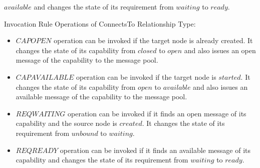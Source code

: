 \documentclass[12pt]{report}
\begin{document}
\begin{description}
\begin{itemize}
    $available$ and changes the state of its requirement from
    $waiting$ to $ready$.
  \end{itemize}
\item[] Invocation Rule Operations of ConnectsTo Relationship Type:
  \begin{itemize}
  \item $CAPOPEN$ operation can be invoked if the target node is
    already created. It changes the state of its capability from
    $closed$ to $open$ and also issues an open message of the
    capability to the message pool.
  \item $CAPAVAILABLE$ operation can be invoked if the target node is
    $started$. It changes the state of its capability from $open$ to
    $available$ and also issues an available message of the capability
    to the message pool.
  \item $REQWAITING$ operation can be invoked if it finds an open
    message of its capability and the source node is $created$. It
    changes the state of its requirement from $unbound$ to $waiting$.
  \item $REQREADY$ operation can be invoked if it finds an available
    message of its capability and changes the state of its requirement from
    $waiting$ to $ready$.
  \end{itemize}
\end{description}

\end{document}
